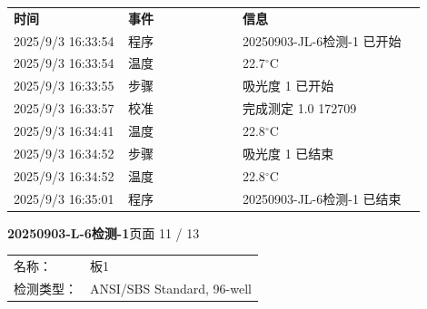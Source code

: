 \documentclass[UTF8,10pt,a4paper,fontset=fandol]{ctexart}
\newcommand{\fieldvalue}[1]{#1}
\begin{document}
\begin{tabular}{@{}p{0.25\linewidth}p{0.25\linewidth}p{0.40\linewidth}@{}}
\textbf{时间} & \textbf{事件} & \textbf{信息}\\
\fieldvalue{2025/9/3 16:33:54} &
\fieldvalue{程序} &
\fieldvalue{20250903-JL-6检测-1 已开始}\\
\fieldvalue{2025/9/3 16:33:54} &
\fieldvalue{温度} &
\fieldvalue{22.7$^\circ$C}\\
\fieldvalue{2025/9/3 16:33:55} &
\fieldvalue{步骤} &
\fieldvalue{吸光度 1 已开始}\\
\fieldvalue{2025/9/3 16:33:57} &
\fieldvalue{校准} &
\fieldvalue{完成测定 1.0 172709}\\
\fieldvalue{2025/9/3 16:34:41} &
\fieldvalue{温度} &
\fieldvalue{22.8$^\circ$C}\\
\fieldvalue{2025/9/3 16:34:52} &
\fieldvalue{步骤} &
\fieldvalue{吸光度 1 已结束}\\
\fieldvalue{2025/9/3 16:34:52} &
\fieldvalue{温度} &
\fieldvalue{22.8$^\circ$C}\\
\fieldvalue{2025/9/3 16:35:01} &
\fieldvalue{程序} &
\fieldvalue{20250903-JL-6检测-1 已结束}\\
\end{tabular}

\newpage

\begin{center}
\textbf{20250903-L-6检测-1}\hfill 页面 11 / 13

\smallskip
\begin{tabular}{@{}ll@{}}
名称： & 板1\\
检测类型： & ANSI/SBS Standard, 96-well
\end{tabular}
\end{center}
\end{document}

